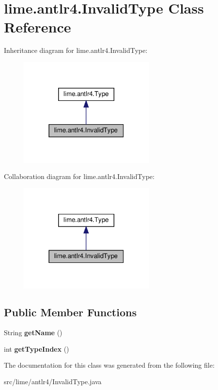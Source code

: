 \hypertarget{classlime_1_1antlr4_1_1InvalidType}{}\section{lime.\+antlr4.\+Invalid\+Type Class Reference}
\label{classlime_1_1antlr4_1_1InvalidType}


Inheritance diagram for lime.\+antlr4.\+Invalid\+Type\+:
\nopagebreak
\begin{figure}[H]
\begin{center}
\leavevmode
\includegraphics[width=195pt]{classlime_1_1antlr4_1_1InvalidType__inherit__graph}
\end{center}
\end{figure}


Collaboration diagram for lime.\+antlr4.\+Invalid\+Type\+:
\nopagebreak
\begin{figure}[H]
\begin{center}
\leavevmode
\includegraphics[width=195pt]{classlime_1_1antlr4_1_1InvalidType__coll__graph}
\end{center}
\end{figure}
\subsection*{Public Member Functions}
\begin{DoxyCompactItemize}
\item 
\mbox{\label{classlime_1_1antlr4_1_1InvalidType_a51468b062a42f393646272823cbd7abe}} 
String {\bfseries get\+Name} ()
\item 
\mbox{\label{classlime_1_1antlr4_1_1InvalidType_a1fc1ab76a8844b317ef843f56d6b81ad}} 
int {\bfseries get\+Type\+Index} ()
\end{DoxyCompactItemize}


The documentation for this class was generated from the following file\+:\begin{DoxyCompactItemize}
\item 
src/lime/antlr4/Invalid\+Type.\+java\end{DoxyCompactItemize}
